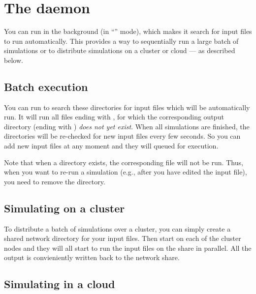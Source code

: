 \section{The \prog daemon}

You can run \prog in the background (in ``'' mode), which makes it search for input files to run automatically. This provides a way to sequentially run a large batch of simulations or to distribute simulations on a cluster or cloud --- as described below.


\subsection{Batch execution}

You can run \prog {}    to search these directories for input files which will be automatically run. It will run all files ending with , for which the corresponding output directory (ending with ) \emph{does not yet exist}.  When all simulations are finished, the directories will be re-checked for new input files every few seconds. So you can add new input files at any moment and they will queued for execution.

Note that when a directory  exists, the corresponding  file will not be run. Thus, when you want to re-run a simulation (e.g., after you have edited the input file), you need to remove the 
 directory.

\subsection{Simulating on a cluster}

To distribute a batch of simulations over a cluster, you can simply create a shared network directory for your input files. Then start \prog {} \emph{} on each of the cluster nodes
and they will all start to run the input files on the share in parallel. All the output is convieniently written back to the network share.

\subsection{Simulating in a cloud}

